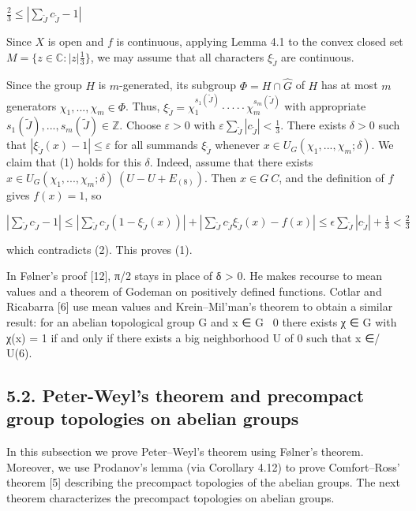\documentclass[12pt]{article}
\begin{document}
    $\frac{2}{3} \leqslant |\sum_{\tilde{J}} c_{\tilde{J}} - 1|$


    Since $X$ is open and $f$ is continuous, applying Lemma 4.1 to the convex closed set $M = \{z \in \mathbb{C}: |z|  \frac{1}{3}\}$, we may assume
that all characters $\xi_{\tilde{J}}$ are continuous.


Since the group $H$ is $m$-generated, its subgroup $\Phi = H \cap \hat{G}$ of $H$ has at most $m$ generators $\chi_1,...,\chi_m \in \Phi$. Thus,
$\xi_{\tilde{J}} = \chi^{s_1(\tilde{J})}_1 · ··· · \chi^{s_m(\tilde{J})}_m$ with appropriate $s_1(\tilde{J}), . . . , s_m(\tilde{J}) \in \mathbb{Z}$. Choose $\varepsilon > 0$ with $\varepsilon \sum_\tilde{J} |c_\tilde{J}| < \frac{1}{3}$. There exists $\delta > 0$ such that
$|\xi_{\tilde{J}}(x) - 1| \leqslant \varepsilon$ for all summands $\xi_{\tilde{J}}$ whenever $x \in U_G (\chi_1,...,\chi_m; \delta)$. We claim that (1) holds for this $\delta$. Indeed, assume that
there exists $x \in U_G (\chi_1,...,\chi_m; \delta) \ (U - U + E_{(8)})$. Then $x \in G \ C$, and the definition of $f$ gives $f(x) = 1$, so


$|\sum_{\tilde{J}} c_{\tilde{J}} - 1| \leqslant |\sum_{\tilde{J}} c_{\tilde{J}}(1 - \xi_{\tilde{J}}(x))| + |\sum_{\tilde{J}} c_{\tilde{J}} \xi_{\tilde{J}}(x) - f(x)| \leqslant \epsilon \sum_{\tilde{J}} |c_{\tilde{J}}| + \frac{1}{3} < \frac{2}{3}$


which contradicts (2). This proves (1). 


    In Følner’s proof [12], π/2 stays in place of δ > 0. He makes recourse to mean values and a theorem of Godeman on
positively defined functions. Cotlar and Ricabarra [6] use mean values and Krein–Mil’man’s theorem to obtain a similar
result: for an abelian topological group G and x ∈ G \ {0} there exists χ ∈ G with χ(x) 	= 1 if and only if there exists a big
neighborhood U of 0 such that x ∈/ U(6).


\subsection{5.2. Peter-Weyl's theorem and precompact group topologies on abelian groups}


    In this subsection we prove Peter–Weyl’s theorem using Følner’s theorem. Moreover, we use Prodanov’s lemma (via
Corollary 4.12) to prove Comfort–Ross’ theorem [5] describing the precompact topologies of the abelian groups.
The next theorem characterizes the precompact topologies on abelian groups.
\end{document}
